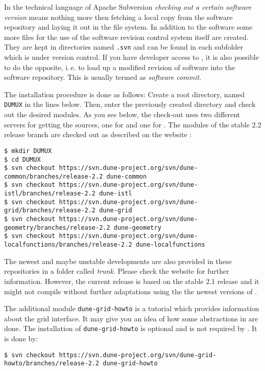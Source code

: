 In the technical language of Apache Subversion \emph{checking out a certain software version} means nothing more then fetching 
a local copy from the software repository and laying it out in the file system.  In addition to the software some more files for the use of the software revision control system itself are created. They are kept in directories named \texttt{.svn} and can be found in each subfolder which is under version control.
If you have developer access to \Dumux, it is also possible to do the opposite, i.\,e. to load up a modified revision of software into the software repository. This is usually termed as \emph{software commit}.

The installation procedure is done as follows:
Create a  {\Dune} root directory, named \texttt{DUMUX} in the lines below.
Then, enter the previously created directory and check out the desired modules. 
As you see below, the check-out uses two different servers for getting the sources, one for \Dune and one for {\Dumux}.
The \Dune modules of the stable 2.2 release branch are checked out as described on the \Dune website \cite{DUNE-DOWNLOAD-SVN}:

\begin{lstlisting}[style=Bash]
$ mkdir DUMUX
$ cd DUMUX
$ svn checkout https://svn.dune-project.org/svn/dune-common/branches/release-2.2 dune-common
$ svn checkout https://svn.dune-project.org/svn/dune-istl/branches/release-2.2 dune-istl
$ svn checkout https://svn.dune-project.org/svn/dune-grid/branches/release-2.2 dune-grid
$ svn checkout https://svn.dune-project.org/svn/dune-geometry/branches/release-2.2 dune-geometry
$ svn checkout https://svn.dune-project.org/svn/dune-localfunctions/branches/release-2.2 dune-localfunctions
\end{lstlisting}

The newest and maybe unstable developments are also provided in these repositories in a folder called \emph{trunk}. Please check the \Dune website \cite{DUNE-DOWNLOAD-SVN} for further information. However, the current \Dumux release is based on the stable 2.1 release and it might not compile without further adaptations using the the newest versions of \Dune.

The additional module \texttt{dune-grid-howto} is a tutorial which provides information about the \Dune grid interface.
It may give you an idea of how some abstractions in \Dune are done.
The installation of \texttt{dune-grid-howto} is optional and is not required by \Dumux. It is done by: 

\begin{lstlisting}[style=Bash]
$ svn checkout https://svn.dune-project.org/svn/dune-grid-howto/branches/release-2.2 dune-grid-howto
\end{lstlisting}

